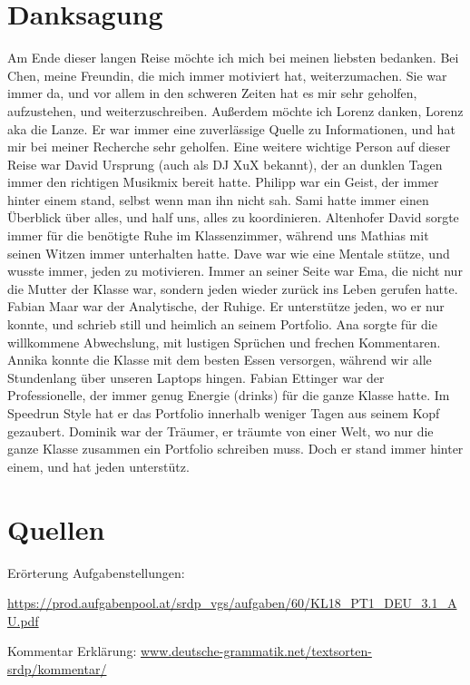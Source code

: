 \section{Danksagung}
Am Ende dieser langen Reise möchte ich mich bei meinen liebsten bedanken. Bei Chen, meine Freundin, die mich immer motiviert hat, weiterzumachen. Sie war immer da, und vor allem in den schweren Zeiten hat es mir sehr geholfen, aufzustehen, und weiterzuschreiben. Außerdem möchte ich Lorenz danken, Lorenz aka die Lanze. Er war immer eine zuverlässige Quelle zu Informationen, und hat mir bei meiner Recherche sehr geholfen. Eine weitere wichtige Person auf dieser Reise war David Ursprung (auch als DJ XuX bekannt), der an dunklen Tagen immer den richtigen Musikmix bereit hatte. Philipp war ein Geist, der immer hinter einem stand, selbst wenn man ihn nicht sah. Sami hatte immer einen Überblick über alles, und half uns, alles zu koordinieren. Altenhofer David sorgte immer für die benötigte Ruhe im Klassenzimmer, während uns Mathias mit seinen Witzen immer unterhalten hatte. Dave war wie eine Mentale stütze, und wusste immer, jeden zu motivieren. Immer an seiner Seite war Ema, die nicht nur die Mutter der Klasse war, sondern jeden wieder zurück ins Leben gerufen hatte. Fabian Maar war der Analytische, der Ruhige. Er unterstütze jeden, wo er nur konnte, und schrieb still und heimlich an seinem Portfolio. Ana sorgte für die willkommene Abwechslung, mit lustigen Sprüchen und frechen Kommentaren. Annika konnte die Klasse mit dem besten Essen versorgen, während wir alle Stundenlang über unseren Laptops hingen.  Fabian Ettinger war der Professionelle, der immer genug Energie (drinks) für die ganze Klasse hatte. Im Speedrun Style hat er das Portfolio innerhalb weniger Tagen aus seinem Kopf gezaubert. Dominik war der Träumer, er träumte von einer Welt, wo nur die ganze Klasse zusammen ein Portfolio schreiben muss. Doch er stand immer hinter einem, und hat jeden unterstütz.  

 
\newpage
\section{Quellen}

Erörterung Aufgabenstellungen: 

\href{https://prod.aufgabenpool.at/srdp\_vgs/aufgaben/60/KL18\_PT1\_DEU\_3.1\_AU.pdf}{https://prod.aufgabenpool.at/srdp\_vgs/aufgaben/60/KL18\_PT1\_DEU\_3.1\_AU.pdf}  

Kommentar Erklärung:  \href{https://www.deutsche-grammatik.net/textsorten-srdp/kommentar/ }{www.deutsche-grammatik.net/textsorten-srdp/kommentar/ }

